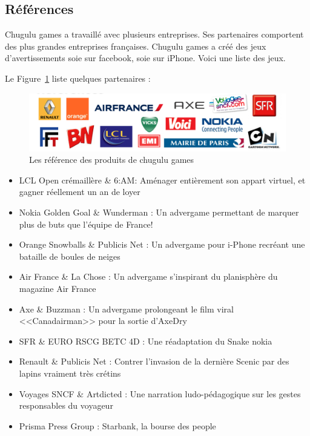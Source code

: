 
\subsection{Références} %

Chugulu games a travaillé avec plusieurs entreprises. Ses partenaires comportent des plus grandes entreprises françaises. Chugulu games a créé des jeux d'avertissements soie sur facebook, soie sur iPhone. Voici une liste des jeux.

Le Figure~\ref{fig:Image_chugulu_reference} liste quelques partenaires : 



\begin{figure}[htbp]
	\centering
		\includegraphics[width=6in]{Image/chugulu_reference.png}
	\caption{Les référence des produits de chugulu games}
	\label{fig:Image_chugulu_reference}
\end{figure}


\begin{itemize}
	\item LCL Open crémaillère \& 6:AM: Aménager entièrement son appart virtuel, et gagner réellement un an de loyer 
	\item Nokia Golden Goal \& Wunderman : Un advergame permettant de marquer plus de buts que l'équipe de France!
	\item Orange Snowballs \& Publicis Net : Un advergame pour i-Phone recréant une bataille de boules de neiges
	\item Air France \& La Chose : Un advergame s'inspirant du planisphère du magazine Air France
	\item Axe \& Buzzman : Un advergame prolongeant le film viral <<Canadairman>> pour la sortie d'AxeDry
	\item SFR \& EURO RSCG BETC 4D : Une réadaptation du Snake nokia 
	\item Renault \& Publicis Net : Contrer l'invasion de la dernière Scenic par des lapins vraiment très crétins
	\item Voyages SNCF \& Artdicted : Une narration ludo-pédagogique sur les gestes responsables du voyageur
	\item Prisma Press Group : Starbank, la bourse des people 
\end{itemize}

